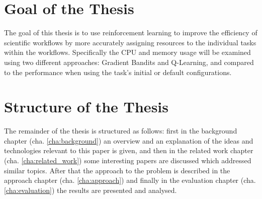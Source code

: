 \section{Goal of the Thesis}
\label{sec:goal}

The goal of this thesis is to use reinforcement learning to improve the efficiency of scientific workflows by more accurately assigning resources to the individual tasks within the workflows. Specifically the CPU and memory usage will be examined using two different approaches: Gradient Bandits and Q-Learning, and compared to the performance when using the task's initial or default configurations.

\section{Structure of the Thesis}
\label{sec:structure}

The remainder of the thesis is structured as follows: first in the background chapter (cha. \ref{cha:background}) an overview and an explanation of the ideas and technologies relevant to this paper is given, and then in the related work chapter (cha. \ref{cha:related_work}) some interesting papers are discussed which addressed similar topics. After that the approach to the problem is described in the approach chapter (cha. \ref{cha:approach}) and finally in the evaluation chapter (cha. \ref{cha:evaluation}) the results are presented and analysed.
